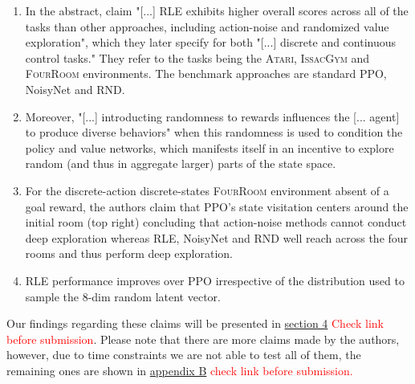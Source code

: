 \documentclass[10pt]{article} %
\begin{document}
\begin{enumerate}
    \item In the abstract, \cite{rle-paper} claim "[...] RLE exhibits higher overall scores across all of the tasks than other approaches, including action-noise and randomized value exploration", which they later specify for both "[...] discrete and continuous control tasks." They refer to the tasks being the \textsc{Atari}, \textsc{IssacGym} and \textsc{FourRoom} environments. The benchmark approaches are standard PPO, NoisyNet and RND.
    \item Moreover, "[...] introducting randomness to rewards influences the [... agent] to produce diverse behaviors" \citep{rle-paper} when this randomness is used to condition the policy and value networks, which manifests itself in an incentive to explore random (and thus in aggregate larger) parts of the state space.
    \item For the discrete-action discrete-states \textsc{FourRoom} environment absent of a goal reward, the authors claim that PPO's state visitation centers around the initial room (top right) concluding that action-noise methods cannot conduct deep exploration whereas RLE, NoisyNet and RND well reach across the four rooms and thus perform deep exploration.
    \item RLE performance improves over PPO irrespective of the distribution used to sample the 8-dim random latent vector.
\end{enumerate}

\noindent Our findings regarding these claims will be presented in \hyperlink{sec4}{section 4} \textcolor{red}{Check link before submission}. Please note that there are more claims made by the authors, however, due to time constraints we are not able to test all of them, the remaining ones are shown in \hyperlink{untested-claims}{appendix B} \textcolor{red}{check link before submission.}
\end{document}
